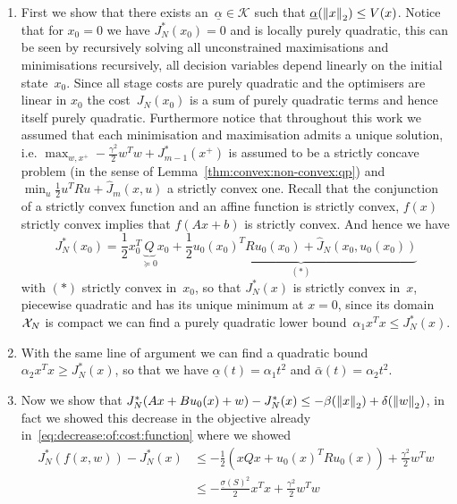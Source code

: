 \begin{enumerate}
\item First we show that there exists an~$\underline\alpha\in\mathscr K$ such that $\underline\alpha(\left\|x\right\|_2)\leq V(x)$.
%
Notice that for $x_0=0$ we have $J_N^\ast(x_0)=0$ and is locally purely quadratic, this can be seen by recursively solving all unconstrained maximisations and minimisations recursively, all decision variables depend linearly on the initial state~$x_0$.
%
Since all stage costs are purely quadratic and the optimisers are linear in $x_0$ the cost~$J_N(x_0)$ is a sum of purely quadratic terms and hence itself purely quadratic.
%
Furthermore notice that throughout this work we assumed that each minimisation and maximisation admits a unique solution, i.e. $\max_{w,x^+}-\frac{\gamma^2}{2} w^Tw + J_{m-1}^\ast(x^+)$ is assumed to be a strictly concave problem (in the sense of Lemma~\ref{thm:convex:non-convex:qp}) and $\min_{u}\frac{1}{2} u^T R u +\hat J_{m}(x,u)$ a strictly convex one.
%
Recall that the conjunction of a strictly convex function and an affine function is strictly convex, $f(x)$ strictly convex implies that $f(Ax+b)$ is strictly convex.
%
And hence we have 
%
\begin{equation}
	J_N^\ast(x_0) = \frac{1}{2}x_0^T \underbrace{Q}_{\succeq0}x_0 + \underbrace{\frac{1}{2}u_0(x_0)^TR u_0(x_0) + \hat J_{N}(x_0,u_0(x_0))}_{(\ast)}
\end{equation}
%
with $(\ast)$ strictly convex in~$x_0$, so that $J_N^\ast(x)$ is strictly convex in~$x$, piecewise quadratic and has its unique minimum at $x=0$, since its domain~$\mathcal X_N$ is compact we can find a purely quadratic lower bound~$\alpha_1 x^Tx\leq J_N^\ast(x)$.
%
\item With the same line of argument we can find a quadratic bound $\alpha_2x^Tx\geq J_N^\ast(x)$, so that we have $\underline\alpha(t)=\alpha_1t^2$ and $\bar\alpha(t)=\alpha_2t^2$.
%
\item Now we show that $J_N^\ast(Ax+Bu_0(x)+w)-J_N^\ast(x)\leq-\beta(\left\|x\right\|_2)+\delta(\left\|w\right\|_2)$, in fact we showed this decrease in the objective already in~\eqref{eq:decrease:of:cost:function} where we showed
%
\begin{equation}\begin{aligned}
	J_N^\ast(f(x,w))-J_N^\ast(x)&\leq -\frac{1}{2}\left( xQx+u_0(x)^TRu_0(x)\right)+\frac{\gamma^2}{2}w^Tw\\
	&\leq -\frac{\underline\sigma(S)^2}{2}x^Tx + \frac{\gamma^2}{2}w^Tw
\end{aligned}\end{equation}
\end{enumerate}
